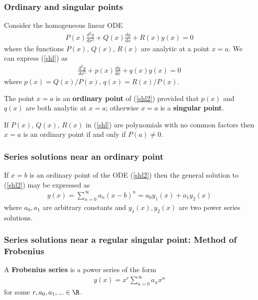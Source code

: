 \documentclass{article}
\begin{document}
\subsubsection{Ordinary and singular points}

Consider the homogeneous linear ODE
\begin{align}
    \label{shl}
    P(x)\frac{d^2y}{dx^2}+Q(x)\frac{dy}{dx}+R(x)y(x)=0
\end{align}
where the functions $P(x)$, $Q(x)$, $R(x)$ are analytic at a point $x=a$.
We can express (\ref{shl}) as
\begin{align}
    \label{shl2}
    \frac{d^2y}{dx^2}+p(x)\frac{dy}{dx}+q(x)y(x)=0
\end{align}
where $p(x)=Q(x)/P(x)$, $q(x)=R(x)/P(x)$.
\begin{definition}
    The point $x=a$ is an \textbf{ordinary point} of (\ref{shl2}) provided that
    $p(x)$ and $q(x)$ are both analytic at $x=a$; otherwise $x=a$ is a
    \textbf{singular point}.
\end{definition}
\begin{lemma}
    If $P(x)$, $Q(x)$, $R(x)$ in (\ref{shl}) are polynomials with no common
    factors then $x=a$ is an ordinary point if and only if $P(a)\not=0$.
\end{lemma}

\subsubsection{Series solutions near an ordinary point}

\begin{theorem}
    If $x=b$ is an ordinary point of the ODE (\ref{shl2}) then the general
    solution to (\ref{shl2}) may be expressed as
    \begin{align*}
        y(x) = \sum_{n=0}^\infty a_n(x-b)^n = a_0y_1(x)+a_1y_2(x)
    \end{align*}
    where $a_0,a_1$ are arbitrary constants and $y_1(x),y_2(x)$ are two
    power series solutions.
\end{theorem}

\subsubsection{Series solutions near a regular singular point: Method of Frobenius}

\begin{definition}
    A \textbf{Frobenius series} is a power series of the form
    \begin{align}
        \label{frob}
        y(x)=x^r\sum_{n=0}^\infty a_nx^n
    \end{align}
    for some $r,a_0,a_1,...\in\R$.
\end{definition}
\end{document}
